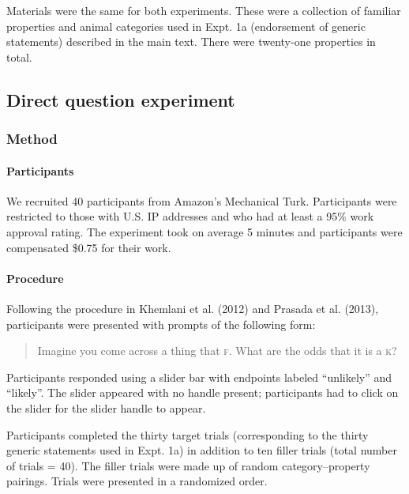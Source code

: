 \documentclass[english,,man,floatsintext]{apa6}
\let\oldparagraph\paragraph
\renewcommand{\paragraph}[1]{\oldparagraph{#1}\mbox{}}
\theoremstyle{definition}
\theoremstyle{definition}
\theoremstyle{definition}
\theoremstyle{remark}
\begin{document}
Materials were the same for both experiments. These were a collection of
familiar properties and animal categories used in Expt. 1a (endorsement
of generic statements) described in the main text. There were twenty-one
properties in total.

\hypertarget{direct-question-experiment}{%
\subsection{Direct question
experiment}\label{direct-question-experiment}}

\hypertarget{method-7}{%
\subsubsection{Method}\label{method-7}}

\hypertarget{participants-7}{%
\paragraph{Participants}\label{participants-7}}

We recruited 40 participants from Amazon's Mechanical Turk. Participants
were restricted to those with U.S. IP addresses and who had at least a
95\% work approval rating. The experiment took on average 5 minutes and
participants were compensated \$0.75 for their work.

\hypertarget{procedure-4}{%
\paragraph{Procedure}\label{procedure-4}}

Following the procedure in Khemlani et al. (2012) and Prasada et al.
(2013), participants were presented with prompts of the following form:

\begin{quotation}
Imagine you come across a thing that \textsc{f}.
What are the odds that it is a \textsc{k}?
\end{quotation}

Participants responded using a slider bar with endpoints labeled
\enquote{unlikely} and \enquote{likely}. The slider appeared with no
handle present; participants had to click on the slider for the slider
handle to appear.

Participants completed the thirty target trials (corresponding to the
thirty generic statements used in Expt. 1a) in addition to ten filler
trials (total number of trials = 40). The filler trials were made up of
random category--property pairings. Trials were presented in a
randomized order.
\end{document}
